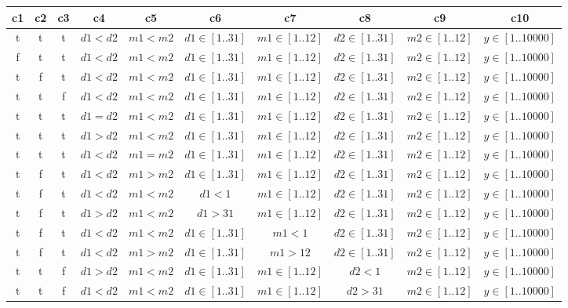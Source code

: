 \documentclass[12pt,a4paper]{article}
\begin{document}
\begin{tabular}{|c|c|c|c|c|c|c|c|c|c|}
\hline
c1 & c2 & c3 & c4 & c5 & c6 & c7 & c8 & c9 & c10 \\
\hline
t & t & t & $d1 < d2$ & $m1 < m2$ & $d1 \in [1..31]$ & $m1 \in [1..12]$ & $d2 \in [1..31]$ & $m2 \in [1..12]$ & $y \in [1..10000]$ \\
\hline
f & t & t & $d1 < d2$ & $m1 < m2$ & $d1 \in [1..31]$ & $m1 \in [1..12]$ & $d2 \in [1..31]$ & $m2 \in [1..12]$ & $y \in [1..10000]$ \\
\hline
t & f & t & $d1 < d2$ & $m1 < m2$ & $d1 \in [1..31]$ & $m1 \in [1..12]$ & $d2 \in [1..31]$ & $m2 \in [1..12]$ & $y \in [1..10000]$ \\
\hline
t & t & f & $d1 < d2$ & $m1 < m2$ & $d1 \in [1..31]$ & $m1 \in [1..12]$ & $d2 \in [1..31]$ & $m2 \in [1..12]$ & $y \in [1..10000]$ \\
\hline
t & t & t & $d1 = d2$ & $m1 < m2$ & $d1 \in [1..31]$ & $m1 \in [1..12]$ & $d2 \in [1..31]$ & $m2 \in [1..12]$ & $y \in [1..10000]$ \\
\hline
t & t & t & $d1 > d2$ & $m1 < m2$ & $d1 \in [1..31]$ & $m1 \in [1..12]$ & $d2 \in [1..31]$ & $m2 \in [1..12]$ & $y \in [1..10000]$ \\
\hline
t & t & t & $d1 < d2$ & $m1 = m2$ & $d1 \in [1..31]$ & $m1 \in [1..12]$ & $d2 \in [1..31]$ & $m2 \in [1..12]$ & $y \in [1..10000]$ \\
\hline
t & f & t & $d1 < d2$ & $m1 > m2$ & $d1 \in [1..31]$ & $m1 \in [1..12]$ & $d2 \in [1..31]$ & $m2 \in [1..12]$ & $y \in [1..10000]$ \\
\hline
t & f & t & $d1 < d2$ & $m1 < m2$ & $d1 < 1$ & $m1 \in [1..12]$ & $d2 \in [1..31]$ & $m2 \in [1..12]$ & $y \in [1..10000]$ \\
\hline
t & f & t & $d1 > d2$ & $m1 < m2$ & $d1 > 31$ & $m1 \in [1..12]$ & $d2 \in [1..31]$ & $m2 \in [1..12]$ & $y \in [1..10000]$ \\
\hline
t & f & t & $d1 < d2$ & $m1 < m2$ & $d1 \in [1..31]$ & $m1 < 1$ & $d2 \in [1..31]$ & $m2 \in [1..12]$ & $y \in [1..10000]$ \\
\hline
t & f & t & $d1 < d2$ & $m1 > m2$ & $d1 \in [1..31]$ & $m1 > 12$ & $d2 \in [1..31]$ & $m2 \in [1..12]$ & $y \in [1..10000]$ \\
\hline
t & t & f & $d1 > d2$ & $m1 < m2$ & $d1 \in [1..31]$ & $m1 \in [1..12]$ & $d2 < 1$ & $m2 \in [1..12]$ & $y \in [1..10000]$ \\
\hline
t & t & f & $d1 < d2$ & $m1 < m2$ & $d1 \in [1..31]$ & $m1 \in [1..12]$ & $d2 > 31$ & $m2 \in [1..12]$ & $y \in [1..10000]$ \\

\end{tabular}
\end{document}
